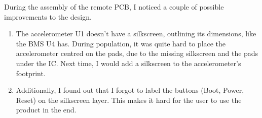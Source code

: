  During the assembly of the remote PCB, I noticed a couple of possible improvements to the design.
 \begin{enumerate}
     \item The accelerometer U1 doesn't have a silkscreen, outlining its dimensions, like the BMS U4 has. During population, it was quite hard to place the accelerometer centred on the pads, due to the missing silkscreen and the pads under the IC. Next time, I would add a silkscreen to the accelerometer's footprint. 
     \item Additionally, I found out that I forgot to label the buttons (Boot, Power, Reset) on the silkscreen layer. This makes it hard for the user to use the product in the end.
 \end{enumerate}
